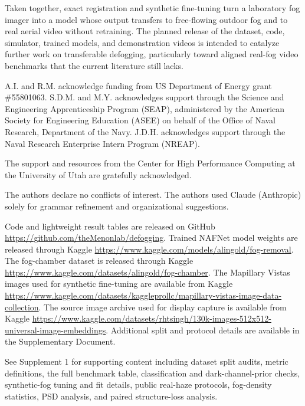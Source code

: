 \documentclass{optica-article}
\begin{document}
Taken together, exact registration and synthetic fine-tuning turn a laboratory fog imager into a model whose output
transfers to free-flowing outdoor fog and to real aerial video
without retraining. The planned release of the dataset, code,
simulator, trained models, and demonstration videos is intended to catalyze further
work on transferable defogging, particularly toward aligned real-fog
video benchmarks that the current literature still lacks.

\begin{backmatter}
 A.I. and R.M. acknowledge funding from US Department of Energy grant \#55801063. S.D.M. and M.Y. acknowledges support through the Science and Engineering Apprenticeship Program (SEAP), administered by the American Society for Engineering Education (ASEE) on behalf of the Office of Naval Research, Department of the Navy. J.D.H. acknowledges support through the Naval Research Enterprise Intern Program (NREAP). 

 The support and resources from the Center for High Performance Computing at the University of Utah are gratefully acknowledged.

 The authors declare no conflicts of interest. The authors used Claude (Anthropic) solely for grammar refinement and organizational suggestions. 

 Code and lightweight result tables are released on GitHub \url{https://github.com/theMenonlab/defogging}. Trained NAFNet model weights are released through Kaggle \url{https://www.kaggle.com/models/alingold/fog-removal}. The fog-chamber dataset is released through Kaggle \url{https://www.kaggle.com/datasets/alingold/fog-chamber}. The Mapillary Vistas images used for synthetic fine-tuning are available from Kaggle \url{https://www.kaggle.com/datasets/kaggleprollc/mapillary-vistas-image-data-collection}. The source image archive used for display capture is available from Kaggle \url{https://www.kaggle.com/datasets/rhtsingh/130k-images-512x512-universal-image-embeddings}. Additional split and protocol details are available in the Supplementary Document.

See Supplement 1 for supporting content including dataset split audits, metric definitions, the full benchmark table, classification and dark-channel-prior checks, synthetic-fog tuning and fit details, public real-haze protocols, fog-density statistics, PSD analysis, and paired structure-loss analysis.

\end{backmatter}


\end{document}
